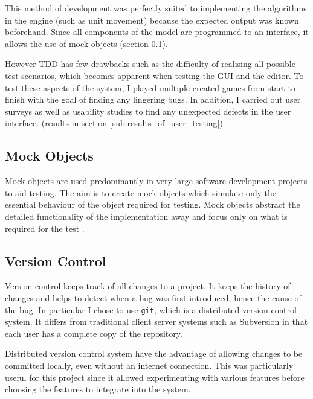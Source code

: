 This method of development was perfectly suited to implementing the algorithms in the engine (such as unit movement) because the expected output was known beforehand.  Since all components of the model are programmed to an interface, it allows the use of mock objects (section \ref{sec:mockobjects}).   


However TDD has few drawbacks such as the difficulty of realising all possible test scenarios, which becomes apparent when testing the GUI and the editor. To test these aspects of the system, I played multiple created games from start to finish with the goal of finding any lingering bugs. In addition, I carried out user surveys as well as usability studies to find any unexpected defects in the user interface. (results in section \ref{sub:results_of_user_testing}) 

\subsection{Mock Objects}
\label{sec:mockobjects}
Mock objects are used predominantly in very large software development projects to aid testing. The aim is to create mock objects which simulate only the essential behaviour of the object required for testing. 
Mock objects abstract  the detailed functionality of the implementation away and  focus only on what is required for the test \cite{Freeman:2009:GOS:1655852}.

\subsection{Version Control}
\label{sub:version_control}
Version control keeps track of all changes to a project. It keeps the history of changes and  helps to detect when a bug was first introduced, hence the cause of the bug. In particular I chose to use \texttt{git}, which is a distributed version control system. It differs from traditional client server systems such as Subversion in that each user has a 
complete copy of the repository. 

Distributed version control system have the advantage of allowing changes to be committed locally, even without an internet connection.  This was particularly useful for this project since it allowed experimenting with various features before choosing the features to integrate into the system.
  

